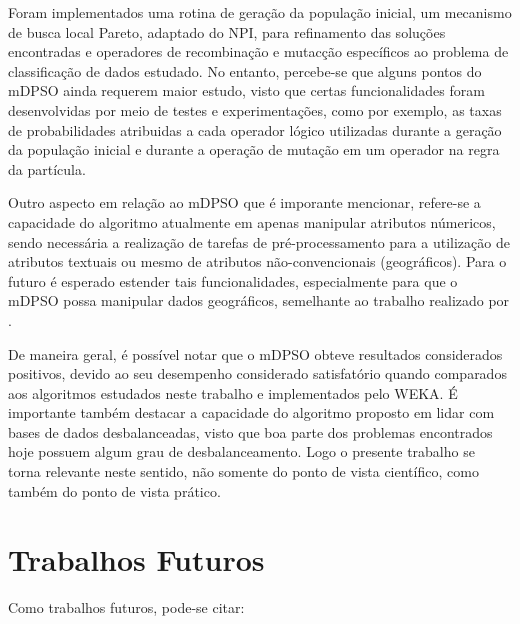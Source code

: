 \documentclass[
	12pt,				%
	openany,			%
	oneside,	
	a4paper,			%
	brazil,				%
	]{unimontes-ppgmsc-abntex2}
\begin{document}
Foram implementados uma rotina de geração da população inicial, um mecanismo de busca local Pareto, adaptado do NPI, para refinamento das soluções encontradas e operadores de recombinação e mutacção específicos ao problema de classificação de dados estudado. No entanto, percebe-se que alguns pontos do mDPSO ainda requerem maior estudo, visto que certas funcionalidades foram desenvolvidas por meio de testes e experimentações, como por exemplo, as taxas de probabilidades atribuidas a cada operador lógico utilizadas durante a geração da população inicial e durante a operação de mutação em um operador na regra da partícula. 

Outro aspecto em relação ao mDPSO que é imporante mencionar, refere-se a capacidade do algoritmo atualmente em apenas manipular atributos númericos, sendo necessária a realização de tarefas de pré-processamento para a utilização de atributos textuais ou mesmo de atributos não-convencionais (geográficos). Para o futuro é esperado estender tais funcionalidades, especialmente para que o mDPSO possa manipular dados geográficos, semelhante ao trabalho realizado por .

De maneira geral, é possível notar que o mDPSO obteve resultados considerados positivos, devido ao seu desempenho considerado satisfatório quando comparados aos algoritmos estudados neste trabalho e implementados pelo WEKA. É importante também destacar a capacidade do algoritmo proposto em lidar com bases de dados desbalanceadas, visto que boa parte dos problemas encontrados hoje possuem algum grau de desbalanceamento. Logo o presente trabalho se torna relevante neste sentido, não somente do ponto de vista científico, como também do ponto de vista prático.

\section{Trabalhos Futuros}

Como trabalhos futuros, pode-se citar:
\end{document}
